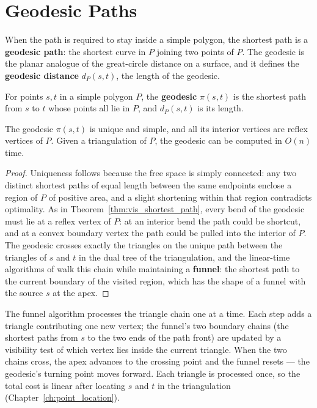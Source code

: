
\section{Geodesic Paths}
\label{sec:visibility_geodesic_paths}

When the path is required to stay inside a simple polygon, the shortest
path is a \textbf{geodesic path}: the shortest curve
in $P$ joining two points of $P$. The geodesic is the planar analogue of
the great-circle distance on a surface, and it defines the \textbf{geodesic
distance} $d_P(s,t)$, the length of the geodesic.

\begin{definition}[Geodesic]\label{def:vis_geodesic}
  For points $s, t$ in a simple polygon $P$, the \textbf{geodesic} $\pi(s,t)$
  is the shortest path from $s$ to $t$ whose points all lie in $P$, and
  $d_P(s,t)$ is its length.
\end{definition}

\begin{theorem}\label{thm:vis_geodesic}
  The geodesic $\pi(s,t)$ is unique and simple, and all its interior
  vertices are reflex vertices of $P$. Given a triangulation of $P$, the
  geodesic can be computed in $O(n)$ time.
\end{theorem}

\begin{proof}
  Uniqueness follows because the free space is simply connected: any two
  distinct shortest paths of equal length between the same endpoints enclose
  a region of $P$ of positive area, and a slight shortening within that
  region contradicts optimality. As in
  Theorem~\ref{thm:vis_shortest_path}, every bend of the geodesic must lie
  at a reflex vertex of $P$: at an interior bend the path could be shortcut,
  and at a convex boundary vertex the path could be pulled into the interior
  of $P$. The geodesic crosses exactly the triangles on the unique path
  between the triangles of $s$ and $t$ in the dual tree of the triangulation,
  and the linear-time algorithms of \cite{guibas1987vis} walk this chain
  while maintaining a \textbf{funnel}: the shortest path to the current
  boundary of the visited region, which has the shape of a funnel with the
  source $s$ at the apex.
\end{proof}

The funnel algorithm processes the triangle chain one at a time. Each step
adds a triangle contributing one new vertex; the funnel's two boundary
chains (the shortest paths from $s$ to the two ends of the path front) are
updated by a visibility test of which vertex lies inside the current
triangle. When the two chains cross, the apex advances to the crossing point
and the funnel resets --- the geodesic's turning point moves forward. Each
triangle is processed once, so the total cost is linear after locating $s$
and $t$ in the triangulation (Chapter~\ref{ch:point_location}).

